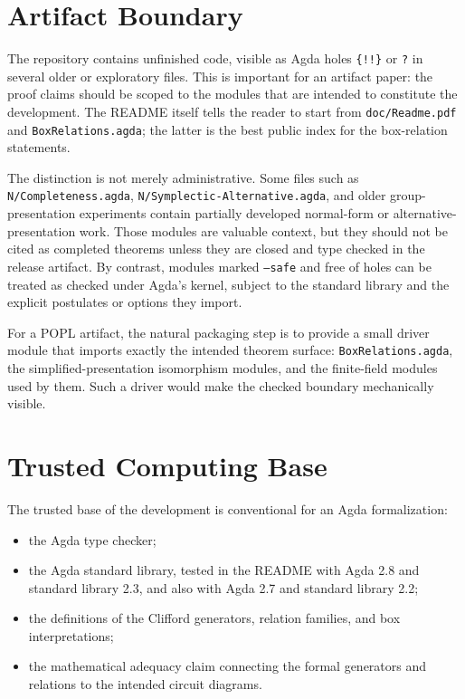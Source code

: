 \documentclass[sigplan,screen,review,anonymous]{acmart}
\newcommand{\Agda}{Agda\xspace}
\newcommand{\file}[1]{\texttt{#1}}
\begin{document}
\section{Artifact Boundary}

The repository contains unfinished code, visible as \Agda holes
\texttt{\{!!\}} or \texttt{?} in several older or exploratory files.
This is important for an artifact paper: the proof claims should be
scoped to the modules that are intended to constitute the development.
The README itself tells the reader to start from
\file{doc/Readme.pdf} and \file{BoxRelations.agda}; the latter is the
best public index for the box-relation statements.

The distinction is not merely administrative.  Some files such as
\file{N/Completeness.agda}, \file{N/Symplectic-Alternative.agda}, and
older group-presentation experiments contain partially developed
normal-form or alternative-presentation work.  Those modules are
valuable context, but they should not be cited as completed theorems
unless they are closed and type checked in the release artifact.  By
contrast, modules marked \texttt{--safe} and free of holes can be
treated as checked under \Agda's kernel, subject to the standard
library and the explicit postulates or options they import.

For a POPL artifact, the natural packaging step is to provide a small
driver module that imports exactly the intended theorem surface:
\file{BoxRelations.agda}, the simplified-presentation isomorphism
modules, and the finite-field modules used by them.  Such a driver
would make the checked boundary mechanically visible.

\section{Trusted Computing Base}

The trusted base of the development is conventional for an \Agda
formalization:

\begin{itemize}
\item the \Agda type checker;
\item the Agda standard library, tested in the README with Agda 2.8
  and standard library 2.3, and also with Agda 2.7 and standard
  library 2.2;
\item the definitions of the Clifford generators, relation families,
  and box interpretations;
\item the mathematical adequacy claim connecting the formal
  generators and relations to the intended circuit diagrams.
\end{itemize}
\end{document}
